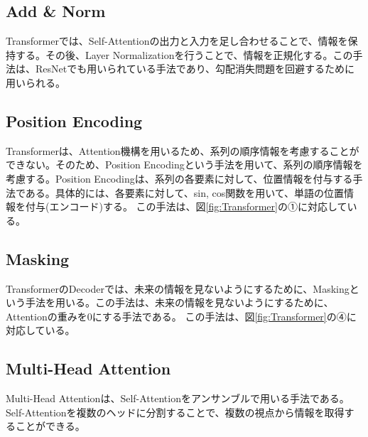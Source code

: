 \documentclass{ltjsarticle}
\begin{document}
\subsection{Add \& Norm}
Transformerでは、Self-Attentionの出力と入力を足し合わせることで、情報を保持する。その後、Layer Normalizationを行うことで、情報を正規化する。この手法は、ResNetでも用いられている手法であり、勾配消失問題を回避するために用いられる。

\subsection{Position Encoding}
Transformerは、Attention機構を用いるため、系列の順序情報を考慮することができない。そのため、Position Encodingという手法を用いて、系列の順序情報を考慮する。Position Encodingは、系列の各要素に対して、位置情報を付与する手法である。具体的には、各要素に対して、sin, cos関数を用いて、単語の位置情報を付与(エンコード)する。
この手法は、図\ref{fig:Transformer}の①に対応している。

\subsection{Masking}
TransformerのDecoderでは、未来の情報を見ないようにするために、Maskingという手法を用いる。この手法は、未来の情報を見ないようにするために、Attentionの重みを0にする手法である。
この手法は、図\ref{fig:Transformer}の④に対応している。

\subsection{Multi-Head Attention}
Multi-Head Attentionは、Self-Attentionをアンサンブルで用いる手法である。Self-Attentionを複数のヘッドに分割することで、複数の視点から情報を取得することができる。

\clearpage
\end{document}
